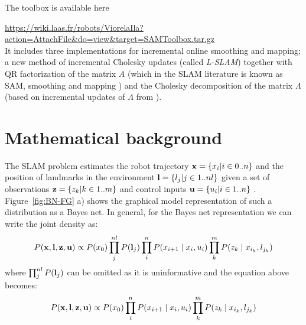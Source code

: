 \documentclass{article}
\begin{document}
The toolbox is available here\\ {\small {\url{https://wiki.laas.fr/robots/ViorelaIla?action=AttachFile&do=view&target=SAMToolbox.tar.gz}}\\ \normalsize It includes three implementations for incremental online smoothing and mapping; a new method of incremental Cholesky updates (called \emph{ L-SLAM}) together with QR factorization of the matrix $A$ (which in the SLAM literature is known as SAM, smoothing and mapping \cite{Dellaert06ijrr}) and the Cholesky decomposition of the matrix $\Lambda$ (based on incremental updates of $\Lambda$ from \cite{Ila10tro}).




\newpage
\thispagestyle{empty}

\section{Mathematical background}
%
The SLAM problem estimates the robot trajectory ${\bf x} =\left\{ x_{i}|i\in0..n\right\} $ and the position of landmarks in the environment ${\bf l} =\left\{ l_{j}|j\in1..nl\right\} $  given a set of observations ${\bf z} =\left\{ z_{k}|k\in1..m\right\}$ and control inputs ${\bf u} =\left\{ u_{i}|i\in1..n\right\}$  . Figure~\ref{fig:BN-FG} a) shows the graphical model representation of such a distribution as a Bayes net. In general, for the Bayes net representation we can write the joint density as:
%
\begin{equation}
P({\bf x},{\bf l},{\bf z},{\bf u})\propto P(x_{0})\prod_{j}^{nl} P({\bf l}_{j})\prod_{i}^{n} P(x_{i+1}\mid x_{i},u_{i})\prod_{k}^{m} P(z_{k}\mid x_{i_k},l_{j_k}) 
\end{equation}
%
where $\prod_{j}^{nl} P({\bf l}_{j})$ can be omitted as it is uninformative and the equation above becomes:
%
\begin{equation}
P({\bf x},{\bf l},{\bf z},{\bf u})\propto P(x_{0})\prod_{i}^{n} P(x_{i+1}\mid x_{i},u_{i})\prod_{k}^{m} P(z_{k}\mid x_{i_k},l_{j_k}) 
\end{equation}
}
\end{document}
